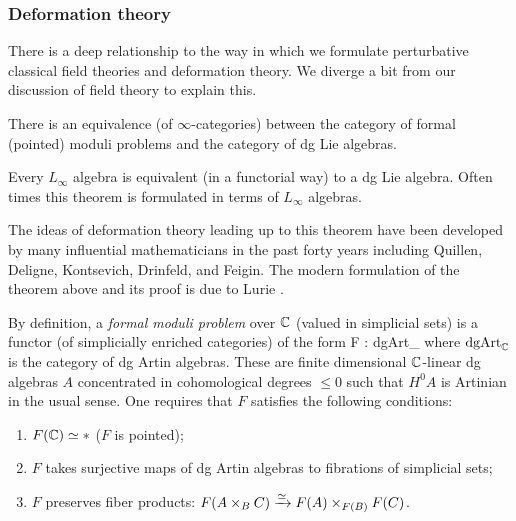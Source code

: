 
\subsubsection{Deformation theory} \label{sec: formal moduli}

There is a deep relationship to the way in which we formulate perturbative classical field theories and deformation theory. 
We diverge a bit from our discussion of field theory to explain this.

\begin{thm}
There is an equivalence (of $\infty$-categories) between the category of formal (pointed) moduli problems and the category of dg Lie algebras.
\end{thm}

\begin{rmk} 
Every $L_\infty$ algebra is equivalent (in a functorial way) to a dg Lie algebra.
Often times this theorem is formulated in terms of $L_\infty$ algebras.
\end{rmk}

The ideas of deformation theory leading up to this theorem have been developed by many influential mathematicians in the past forty years including Quillen, Deligne, Kontsevich, Drinfeld, and Feigin. 
The modern formulation of the theorem above and its proof is due to Lurie \cite{LurieDagX}.

By definition, a {\em formal moduli problem} over $\mathbb C$ (valued in simplicial sets) is a functor (of simplicially enriched categories) of the form
\ben
F : {\rm dgArt}_\CC {}
\een
where ${\rm dgArt}_{\mathbb C}$ is the category of dg Artin algebras. 
These are finite dimensional $\mathbb C$-linear dg algebras $A$ concentrated in cohomological degrees $\leq 0$ such that $H^0 A$ is Artinian in the usual sense.
One requires that $F$ satisfies the following conditions:
\begin{enumerate}
\item $F(\mathbb C) \simeq *$ ($F$ is pointed);
\item $F$ takes surjective maps of dg Artin algebras to fibrations of simplicial sets;
\item $F$ preserves fiber products: $F(A \times_B C) \xrightarrow{\simeq} F(A) \times_{F(B)} F(C)$.
\end{enumerate}

